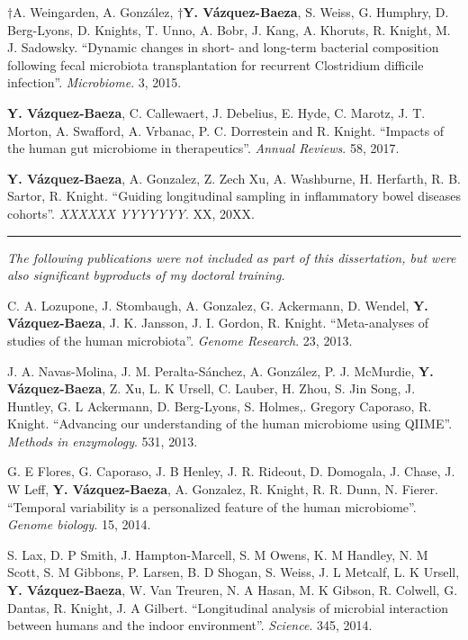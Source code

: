 \begin{frontmatter}
\begin{vitapage}
\begin{publications}
    \item $\dagger$A. Weingarden, A. Gonz\'alez, \textbf{$\dagger$Y. V\'azquez-Baeza}, S. Weiss, G. Humphry, D. Berg-Lyons, D. Knights, T. Unno, A. Bobr, J. Kang, A. Khoruts, R. Knight, M. J. Sadowsky. ``Dynamic changes in short- and long-term bacterial composition following fecal microbiota transplantation for recurrent Clostridium difficile infection''. \emph{Microbiome}. 3, 2015.

    \item \textbf{Y. V\'azquez-Baeza}, C. Callewaert, J. Debelius, E. Hyde, C. Marotz, J. T. Morton, A. Swafford, A. Vrbanac, P. C. Dorrestein and R. Knight. ``Impacts of the human gut microbiome in therapeutics''. \emph{Annual Reviews}. 58, 2017.

    \item \textbf{Y. V\'azquez-Baeza}, A. Gonzalez, Z. Zech Xu, A. Washburne, H. Herfarth, R. B. Sartor, R. Knight. ``Guiding longitudinal sampling in inflammatory bowel diseases cohorts''. \emph{XXXXXX YYYYYYY}. XX, 20XX.

    \item \noindent\rule[0.5ex]{\linewidth}{0.5pt}

    \textsl{The following publications were not included as part of this dissertation, but were also significant byproducts of my doctoral training.}

    \item C. A. Lozupone, J. Stombaugh, A. Gonzalez, G. Ackermann, D. Wendel, \textbf{Y. V\'azquez-Baeza}, J. K. Jansson, J. I. Gordon, R. Knight. ``Meta-analyses of studies of the human microbiota''. \emph{Genome Research}. 23, 2013.

    \item J. A. Navas-Molina, J. M. Peralta-S\'anchez, A. Gonz\'alez, P. J. McMurdie, \textbf{Y. V\'azquez-Baeza}, Z. Xu, L. K Ursell, C. Lauber, H. Zhou, S. Jin Song, J. Huntley, G. L Ackermann, D. Berg-Lyons, S. Holmes,. Gregory Caporaso, R. Knight. ``Advancing our understanding of the human microbiome using QIIME''. \emph{Methods in enzymology}. 531, 2013.

    \item G. E Flores, G. Caporaso, J. B Henley, J. R. Rideout, D. Domogala, J. Chase, J. W Leff, \textbf{Y. V\'azquez-Baeza}, A. Gonzalez, R. Knight, R. R. Dunn, N. Fierer. ``Temporal variability is a personalized feature of the human microbiome''. \emph{Genome biology}. 15, 2014.

    \item S. Lax, D. P Smith, J. Hampton-Marcell, S. M Owens, K. M Handley, N. M Scott, S. M Gibbons, P. Larsen, B. D Shogan, S. Weiss, J. L Metcalf, L. K Ursell, \textbf{Y. V\'azquez-Baeza}, W. Van Treuren, N. A Hasan, M. K Gibson, R. Colwell, G. Dantas, R. Knight, J. A Gilbert. ``Longitudinal analysis of microbial interaction between humans and the indoor environment''. \emph{Science}. 345, 2014.


\end{publications}
\end{vitapage}
\end{frontmatter}
